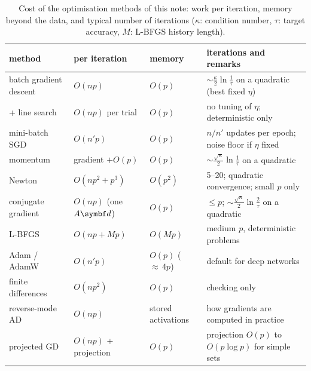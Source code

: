\documentclass[11pt]{article}
\begin{document}
\begin{table}[H]
\centering\small
\caption{Cost of the optimisation methods of this note: work per iteration, memory beyond the data, and typical number
of iterations ($\kappa$: condition number, $\tau$: target accuracy, $M$: L-BFGS history length).}
\label{tab:costs}
\begin{tabular}{@{}L{3.3cm}L{2.5cm}L{2.3cm}L{6.2cm}@{}}
\toprule
method & per iteration & memory & iterations and remarks \\
\midrule
batch gradient descent & $O(np)$ & $O(p)$ & $\sim\frac{\kappa}{2}\ln\frac1\tau$ on a quadratic (best fixed $\eta$) \\
\quad + line search & $O(np)$ per trial & $O(p)$ & no tuning of $\eta$; deterministic only \\
mini-batch SGD & $O(n'p)$ & $O(p)$ & $n/n'$ updates per epoch; noise floor if $\eta$ fixed \\
momentum & gradient $+ O(p)$ & $O(p)$ & $\sim\frac{\sqrt\kappa}{2}\ln\frac1\tau$ on a quadratic \\
Newton & $O(np^2 + p^3)$ & $O(p^2)$ & 5--20; quadratic convergence; small $p$ only \\
conjugate gradient & $O(np)$ (one $A\vect{d}$) & $O(p)$ & $\le p$; $\sim\frac{\sqrt\kappa}{2}\ln\frac2\tau$ on a quadratic \\
L-BFGS & $O(np + Mp)$ & $O(Mp)$ & medium $p$, deterministic problems \\
Adam / AdamW & $O(n'p)$ & $O(p)$ (${\approx}\,4p$) & default for deep networks \\
finite differences & $O(np^2)$ & $O(p)$ & checking only \\
reverse-mode AD & $O(np)$ & stored activations & how gradients are computed in practice \\
projected GD & $O(np)$ + projection & $O(p)$ & projection $O(p)$ to $O(p\log p)$ for simple sets \\
\bottomrule
\end{tabular}
\end{table}
\end{document}
